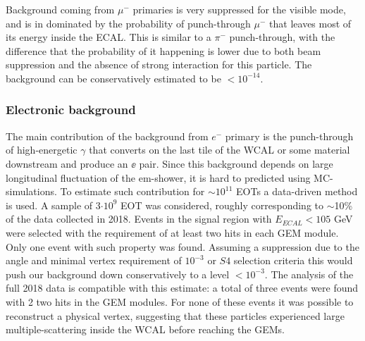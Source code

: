 Background coming from $\mu^-$ primaries is very suppressed for the visible mode, and is in dominated by the probability of punch-through $\mu^-$ that leaves most of its energy inside the ECAL. This is similar to a $\pi^-$ punch-through, with the difference that the probability of it happening is lower due to both beam suppression and the absence of strong interaction for this particle. The background can be conservatively estimated to be $<10^{-14}$.

\subsubsection{Electronic background}
\label{ch3:sec:bkg:vis:elec}

The main contribution of the background from $e^-$ primary is the punch-through of high-energetic $\gamma$ that converts on the last tile of the WCAL or some material downstream and produce an $\ee$ pair. Since this background depends on large longitudinal fluctuation of the em-shower, it is hard to predicted using MC-simulations. To estimate such contribution for $\sim10^{11}$ EOTs a data-driven method is used. A sample of 3$\cdot 10^9$ EOT was considered, roughly corresponding to $\sim$10\% of the data collected in 2018. Events in the signal region with $E_{ECAL} < 105$ GeV were selected with the requirement of at least two hits in each GEM module. Only one event with such property was found. Assuming a suppression due to the angle and minimal vertex requirement of $10^{-3}$ or $S4$ selection criteria this would push our background down conservatively to a level $<10^{-3}$. The analysis of the full 2018 data is compatible with this estimate: a total of three events were found with 2 two hits in the GEM modules. For none of these events it was possible to reconstruct a physical vertex, suggesting that these particles experienced large multiple-scattering inside the WCAL before reaching the GEMs.



